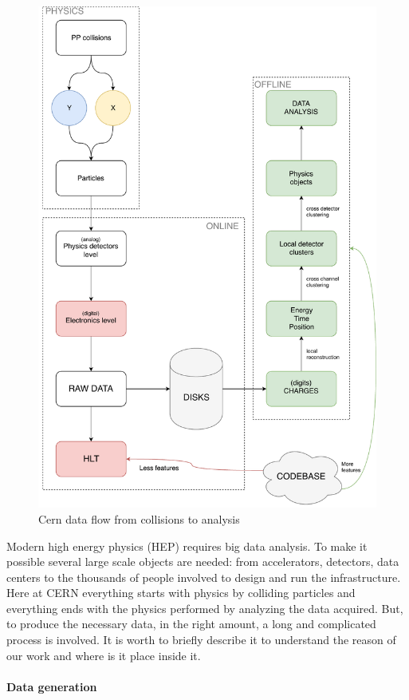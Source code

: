 \begin{figure}[ht]
  \caption{Cern data flow from collisions to analysis}
  \label{img:}
  \includegraphics[height=\textheight]{img/dataflow}
\end{figure}
Modern high energy physics (HEP) requires big data analysis. To make it possible several large scale objects are needed: from accelerators, detectors, data centers to the thousands of people involved to design and run the infrastructure. Here at CERN everything starts with physics by colliding particles and everything ends with the physics performed by analyzing the data acquired. But, to produce the necessary data, in the right amount, a long and complicated process is involved. It is worth to briefly describe it to understand the reason of our work and where is it place inside it. \\
\paragraph{Data generation}

